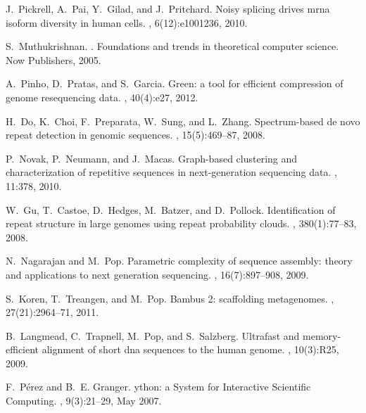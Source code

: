 \documentclass{pnastwo}
\begin{document}
\begin{article}
\begin{thebibliography}{20}
J.~Pickrell, A.~Pai, Y.~Gilad, and J.~Pritchard.
\newblock Noisy splicing drives mrna isoform diversity in human cells.
, 6(12):e1001236, 2010.

S.~Muthukrishnan.
.
\newblock Foundations and trends in theoretical computer science. Now
  Publishers, 2005.

A.~Pinho, D.~Pratas, and S.~Garcia.
\newblock Green: a tool for efficient compression of genome resequencing data.
, 40(4):e27, 2012.

H.~Do, K.~Choi, F.~Preparata, W.~Sung, and L.~Zhang.
\newblock Spectrum-based de novo repeat detection in genomic sequences.
, 15(5):469--87, 2008.

P.~Novak, P.~Neumann, and J.~Macas.
\newblock Graph-based clustering and characterization of repetitive sequences
  in next-generation sequencing data.
, 11:378, 2010.

W.~Gu, T.~Castoe, D.~Hedges, M.~Batzer, and D.~Pollock.
\newblock Identification of repeat structure in large genomes using repeat
  probability clouds.
, 380(1):77--83, 2008.

N.~Nagarajan and M.~Pop.
\newblock Parametric complexity of sequence assembly: theory and applications
  to next generation sequencing.
, 16(7):897--908, 2009.

S.~Koren, T.~Treangen, and M.~Pop.
\newblock Bambus 2: scaffolding metagenomes.
, 27(21):2964--71, 2011.

B.~Langmead, C.~Trapnell, M.~Pop, and S.~Salzberg.
\newblock Ultrafast and memory-efficient alignment of short dna sequences to
  the human genome.
, 10(3):R25, 2009.

F.~P\'erez and B.~E. Granger.
ython: a {S}ystem for {I}nteractive {S}cientific {C}omputing.
, 9(3):21--29, May 2007.



\end{thebibliography}
\end{article}
\end{document}
